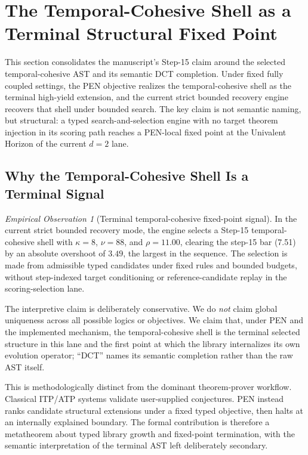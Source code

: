 \documentclass[11pt,a4paper]{article}
\theoremstyle{plain}
\theoremstyle{definition}
\theoremstyle{remark}
\newtheorem{observation}[theorem]{Empirical Observation}
\begin{document}
\section{The Temporal-Cohesive Shell as a Terminal Structural Fixed Point}
\label{sec:decomposition}
\label{sec:dct-discovery}

This section consolidates the manuscript's Step-15 claim around the selected temporal-cohesive AST and its semantic DCT completion.
Under fixed fully coupled settings, the PEN objective realizes the temporal-cohesive shell as the terminal high-yield extension, and the current strict bounded recovery engine recovers that shell under bounded search.
The key claim is not semantic naming, but structural: a typed search-and-selection engine with no target theorem injection in its scoring path reaches a PEN-local fixed point at the Univalent Horizon of the current $d=2$ lane.

\subsection{Why the Temporal-Cohesive Shell Is a Terminal Signal}

\begin{observation}[Terminal temporal-cohesive fixed-point signal]
\label{thm:spectral}
In the current strict bounded recovery mode, the engine selects a Step-15 temporal-cohesive shell with $\kappa=8$, $\nu=88$, and $\rho=11.00$, clearing the step-15 bar (7.51) by an absolute overshoot of $3.49$, the largest in the sequence.
The selection is made from admissible typed candidates under fixed rules and bounded budgets, without step-indexed target conditioning or reference-candidate replay in the scoring-selection lane.
\end{observation}

The interpretive claim is deliberately conservative.
We do \emph{not} claim global uniqueness across all possible logics or objectives.
We claim that, under PEN and the implemented mechanism, the temporal-cohesive shell is the terminal selected structure in this lane and the first point at which the library internalizes its own evolution operator; ``DCT'' names its semantic completion rather than the raw AST itself.

This is methodologically distinct from the dominant theorem-prover workflow.
Classical ITP/ATP systems validate user-supplied conjectures.
PEN instead ranks candidate structural extensions under a fixed typed objective, then halts at an internally explained boundary.
The formal contribution is therefore a metatheorem about typed library growth and fixed-point termination, with the semantic interpretation of the terminal AST left deliberately secondary.
\end{document}
